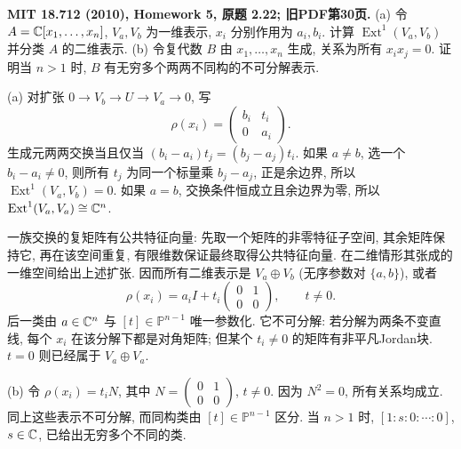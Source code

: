 \begin{exercise}\label{hw:2.22}
\textbf{MIT 18.712 (2010), Homework 5, 原题 2.22; 旧PDF第30页.}
(a) 令 $A=\mathbb C[x_1,\ldots,x_n]$, $V_a,V_b$ 为一维表示, $x_i$ 分别作用为 $a_i,b_i$. 计算 $\operatorname{Ext}^1(V_a,V_b)$ 并分类 $A$ 的二维表示.
(b) 令复代数 $B$ 由 $x_1,\ldots,x_n$ 生成, 关系为所有 $x_ix_j=0$. 证明当 $n>1$ 时, $B$ 有无穷多个两两不同构的不可分解表示.
\end{exercise}
\begin{solution}
(a) 对扩张 $0\to V_b\to U\to V_a\to0$, 写
\[
 \rho(x_i)=\begin{pmatrix}b_i&t_i\\0&a_i\end{pmatrix}.
\]
生成元两两交换当且仅当 $(b_i-a_i)t_j=(b_j-a_j)t_i$. 如果 $a\ne b$, 选一个 $b_i-a_i\ne0$, 则所有 $t_j$ 为同一个标量乘 $b_j-a_j$, 正是余边界, 所以 $\operatorname{Ext}^1(V_a,V_b)=0$. 如果 $a=b$, 交换条件恒成立且余边界为零, 所以 $\operatorname{Ext}^1(V_a,V_a)\cong\mathbb C^n$.

一族交换的复矩阵有公共特征向量: 先取一个矩阵的非零特征子空间, 其余矩阵保持它, 再在该空间重复, 有限维数保证最终取得公共特征向量. 在二维情形其张成的一维空间给出上述扩张. 因而所有二维表示是 $V_a\oplus V_b$ (无序参数对 $\{a,b\}$), 或者
\[
 \rho(x_i)=a_i I+t_i\begin{pmatrix}0&1\\0&0\end{pmatrix},
 \qquad t\ne0.
\]
后一类由 $a\in\mathbb C^n$ 与 $[t]\in\mathbb P^{n-1}$ 唯一参数化. 它不可分解: 若分解为两条不变直线, 每个 $x_i$ 在该分解下都是对角矩阵; 但某个 $t_i\ne0$ 的矩阵有非平凡Jordan块. $t=0$ 则已经属于 $V_a\oplus V_a$.

(b) 令 $\rho(x_i)=t_iN$, 其中 $N=\begin{pmatrix}0&1\\0&0\end{pmatrix}$, $t\ne0$. 因为 $N^2=0$, 所有关系均成立. 同上这些表示不可分解, 而同构类由 $[t]\in\mathbb P^{n-1}$ 区分. 当 $n>1$ 时, $[1:s:0:\cdots:0]$, $s\in\mathbb C$, 已给出无穷多个不同的类.
\end{solution}

